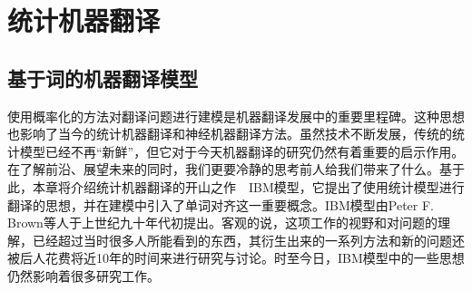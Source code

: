
%


\renewcommand\figurename{图} %
\renewcommand\tablename{表}%


\part{统计机器翻译}


\chapter{基于词的机器翻译模型}

\parinterval 使用概率化的方法对翻译问题进行建模是机器翻译发展中的重要里程碑。这种思想也影响了当今的统计机器翻译和神经机器翻译方法。虽然技术不断发展，传统的统计模型已经不再``新鲜''，但它对于今天机器翻译的研究仍然有着重要的启示作用。在了解前沿、展望未来的同时，我们更要冷静的思考前人给我们带来了什么。基于此，本章将介绍统计机器翻译的开山之作\ \dash \ IBM模型，它提出了使用统计模型进行翻译的思想，并在建模中引入了单词对齐这一重要概念。IBM模型由Peter F. Brown等人于上世纪九十年代初提出\cite{Peter1993The}。客观的说，这项工作的视野和对问题的理解，已经超过当时很多人所能看到的东西，其衍生出来的一系列方法和新的问题还被后人花费将近10年的时间来进行研究与讨论。时至今日，IBM模型中的一些思想仍然影响着很多研究工作。

